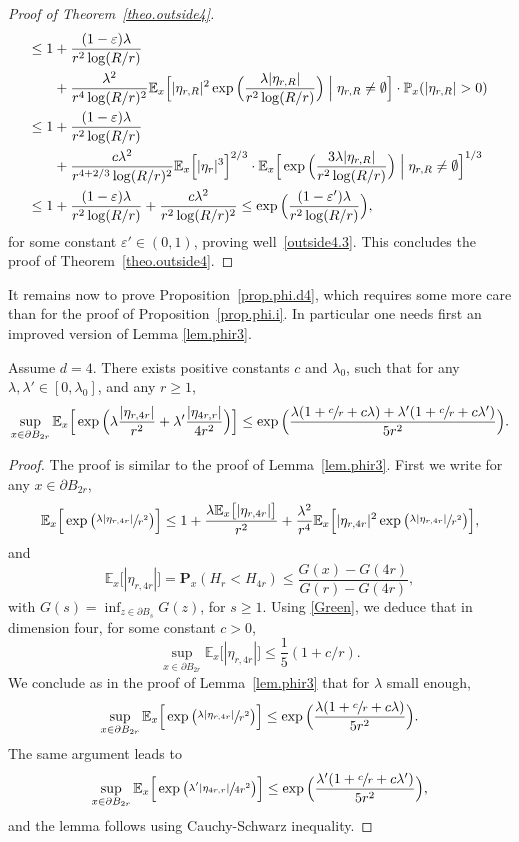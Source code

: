 \begin{proof}[Proof of Theorem~\ref{theo.outside4}]
\begin{align*}
\le 1&+\frac{(1-\varepsilon)\lambda}{r^2\log(R/r)}\\
&+ \frac{\lambda^2}{r^4\log(R/r)^2}
\mathbb E_x\Big[|\eta_{r,R}|^2\exp\Big(\frac{\lambda|\eta_{r,R}|}{r^2\log(R/r)}\Big)\Bigm| \eta_{r,R}\neq \emptyset\Big]\cdot \mathbb P_x(|\eta_{r,R}|>0) \\
\le 1&+\frac{(1-\varepsilon)\lambda}{r^2\log(R/r)}\\
&+ \frac{c\lambda^2}{r^{4+2/3}\log(R/r)^2}
\mathbb E_x\Big[|\eta_r|^3\Big]^{2/3} \cdot
\mathbb E_x\Big[\exp\Big(\frac{3\lambda|\eta_{r,R}|}{r^2\log(R/r)}\Big)\Bigm| \eta_{r,R}\neq \emptyset\Big]^{1/3}\\
\le 1&+\frac{(1-\varepsilon)\lambda}{r^2\log(R/r)} + \frac{c\lambda^2}{r^2\log(R/r)^2}\le \exp\Big(\frac{(1-\varepsilon')\lambda}{r^2\log (R/r)}\Big),
\end{align*}
for some constant $\varepsilon'\in(0,1)$, proving well~\eqref{outside4.3}. This concludes the proof of Theorem~\ref{theo.outside4}.
\end{proof}
It remains now to prove Proposition~\ref{prop.phi.d4}, which requires some more care than for the proof of Proposition~\ref{prop.phi.i}.
In particular one needs first an improved version of Lemma \ref{lem.phir3}.

\begin{lemma}\label{lem.phir4}
Assume $d=4$. There exists positive constants $c$ and $\lambda_0$, such that for any $\lambda, \lambda'\in[0,\lambda_0]$, and any $r\ge 1$,
\[
\sup_{x\in \partial B_{2r}} \mathbb E_x \Big[\exp\Big(\lambda\frac{|\eta_{r,4r}|}{r^2} +
\lambda' \frac{|\eta_{4r,r}|}{4r^2}\Big)\Big] \le \exp\Big(\frac{\lambda(1+\sfrac{c}{r}+c\lambda)+ \lambda'(1+\sfrac{c}{r}+c\lambda')}{5r^2}\Big).
\]
\end{lemma}
\begin{proof}
The proof is similar to the proof of Lemma~\ref{lem.phir3}. First we write for any $x\in \partial B_{2r}$,
\[
\mathbb E_x\Big[\exp\big(\sfrac{\lambda |\eta_{r,4r}|}{r^2}\big)\Big] \le 1+ \frac{\lambda \mathbb E_x\big[|\eta_{r,4r}|\big]}{r^2} +
\frac{\lambda^2}{r^4} \mathbb E_x\Big[|\eta_{r,4r}|^2\exp\big(\sfrac{\lambda |\eta_{r,4r}|}{r^2}\big)\Big],
\]
and
\[
\mathbb E_x\big[|\eta_{r,4r}|\big] = \mathbf P_x(H_r<H_{4r}) \le \frac{G(x) - G(4r)}{G(r)- G(4r)},
\]
with $G(s)= \inf_{z\in \partial B_s} G(z)$, for $s\ge 1$. Using \eqref{Green}, we deduce that in dimension four, for some constant $c>0$,
\[
\sup_{x\in \partial B_{2r}} \mathbb E_x\big[|\eta_{r,4r}|\big] \le \frac{1}{5} (1+ c/r).
\]
We conclude as in the proof of Lemma~\ref{lem.phir3} that for $\lambda$ small enough,
\[
\sup_{x\in \partial B_{2r}} \mathbb E_x\Big[\exp\big(\sfrac{\lambda |\eta_{r,4r}|}{r^2}\big)\Big] \le \exp\Big(\frac{\lambda(1+\sfrac{c}{r}+c\lambda)}{5r^2}\Big).
\]
The same argument leads to
\[
\sup_{x\in \partial B_{2r}} \mathbb E_x\Big[\exp\big(\sfrac{\lambda' |\eta_{4r,r}|}{4r^2}\big)\Big] \le \exp\Big(\frac{\lambda'(1+\sfrac{c}{r}+c\lambda')}{5r^2}\Big),
\]
and the lemma follows using Cauchy-Schwarz inequality.
\end{proof}

